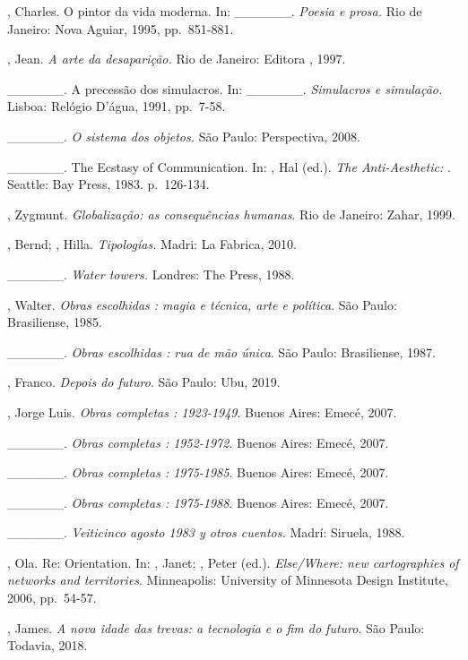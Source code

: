 \begin{Parskip}
, Charles. O pintor da vida moderna. In: \_\_\_\_\_\_.
\emph{Poesia e prosa.} Rio de Janeiro: Nova Aguiar, 1995, pp.~851-881.

, Jean. \emph{A arte da desaparição.} Rio de Janeiro:
Editora , 1997.

\_\_\_\_\_\_. A precessão dos simulacros. In: \_\_\_\_\_\_.
\emph{Simulacros e simulação.} Lisboa: Relógio D'água, 1991, pp.~7-58.

\_\_\_\_\_\_. \emph{O sistema dos objetos.} São Paulo:
Perspectiva, 2008.

\_\_\_\_\_\_. The Ecstasy of Communication. In: , Hal (ed.). \emph{The Anti-Aesthetic: }. Seattle: Bay Press, 1983. p.~126-134.

, Zygmunt. \emph{Globalização: as consequências humanas}. Rio de
Janeiro: Zahar, 1999.

, Bernd; , Hilla. \emph{Tipologías.} Madri: La Fabrica,
2010.

\_\_\_\_\_\_. \emph{Water towers.} Londres: The  Press, 1988.

, Walter. \emph{Obras escolhidas : magia e técnica, arte e
política}. São Paulo: Brasiliense, 1985.

\_\_\_\_\_\_. \emph{Obras escolhidas : rua de mão única}. São
Paulo: Brasiliense, 1987.

, Franco. \emph{Depois do futuro}. São Paulo: Ubu, 2019.

, Jorge Luis. \emph{Obras completas : 1923-1949}. Buenos Aires:
Emecé, 2007.

\_\_\_\_\_\_. \emph{Obras completas : 1952-1972}. Buenos Aires:
Emecé, 2007.

\_\_\_\_\_\_. \emph{Obras completas : 1975-1985}. Buenos Aires:
Emecé, 2007.

\_\_\_\_\_\_. \emph{Obras completas : 1975-1988}. Buenos Aires:
Emecé, 2007.

\_\_\_\_\_\_. \emph{Veiticinco agosto 1983 y otros cuentos.}
Madrí: Siruela, 1988.

, Ola. Re: Orientation. In: , Janet; , Peter (ed.). \emph{Else/Where: new cartographies of networks and territories}.
Minneapolis: University of Minnesota Design Institute, 2006, pp.~54-57.

, James. \emph{A nova idade das trevas: a tecnologia e o fim do futuro}. São Paulo: Todavia, 2018.


\end{Parskip}
